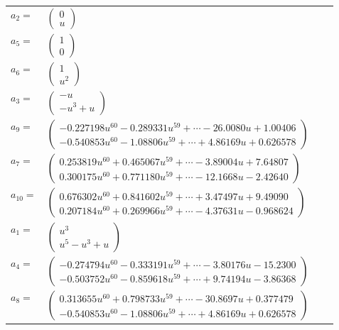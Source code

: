 \documentclass[1p]{elsarticle_modified}
\theoremstyle{definition}
\begin{document}
\begin{tabular}{m{7pt} m{180pt} m{7pt} m{180pt} }
\flushright $a_{2}=$&$\begin{pmatrix}0\\u\end{pmatrix}$ \\
\flushright $a_{5}=$&$\begin{pmatrix}1\\0\end{pmatrix}$ \\
\flushright $a_{6}=$&$\begin{pmatrix}1\\u^2\end{pmatrix}$ \\
\flushright $a_{3}=$&$\begin{pmatrix}- u\\- u^3+u\end{pmatrix}$ \\
\flushright $a_{9}=$&$\begin{pmatrix}-0.227198 u^{60}-0.289331 u^{59}+\cdots-26.0080 u+1.00406\\-0.540853 u^{60}-1.08806 u^{59}+\cdots+4.86169 u+0.626578\end{pmatrix}$ \\
\flushright $a_{7}=$&$\begin{pmatrix}0.253819 u^{60}+0.465067 u^{59}+\cdots-3.89004 u+7.64807\\0.300175 u^{60}+0.771180 u^{59}+\cdots-12.1668 u-2.42640\end{pmatrix}$ \\
\flushright $a_{10}=$&$\begin{pmatrix}0.676302 u^{60}+0.841602 u^{59}+\cdots+3.47497 u+9.49090\\0.207184 u^{60}+0.269966 u^{59}+\cdots-4.37631 u-0.968624\end{pmatrix}$ \\
\flushright $a_{1}=$&$\begin{pmatrix}u^3\\u^5- u^3+u\end{pmatrix}$ \\
\flushright $a_{4}=$&$\begin{pmatrix}-0.274794 u^{60}-0.333191 u^{59}+\cdots-3.80176 u-15.2300\\-0.503752 u^{60}-0.859618 u^{59}+\cdots+9.74194 u-3.86368\end{pmatrix}$ \\
\flushright $a_{8}=$&$\begin{pmatrix}0.313655 u^{60}+0.798733 u^{59}+\cdots-30.8697 u+0.377479\\-0.540853 u^{60}-1.08806 u^{59}+\cdots+4.86169 u+0.626578\end{pmatrix}$ \\

\end{tabular}
\end{document}
